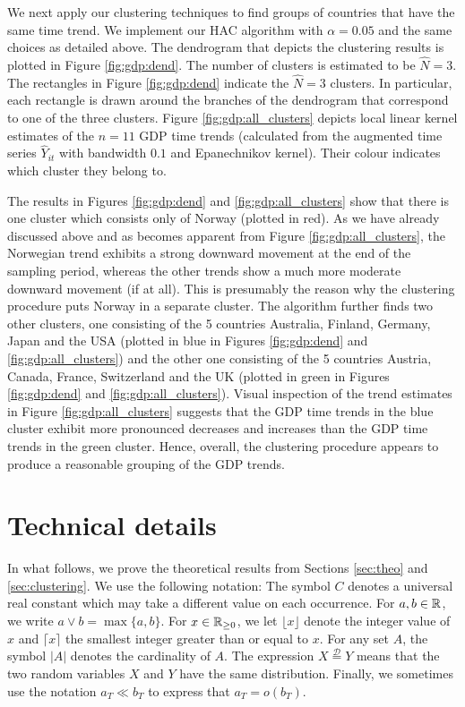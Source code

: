\documentclass[12pt]{article}
\begin{document}
We next apply our clustering techniques to find groups of countries that have the same time trend. We implement our HAC algorithm with $\alpha = 0.05$ and the same choices as detailed above. The dendrogram that depicts the clustering results is plotted in Figure \ref{fig:gdp:dend}. The number of clusters is estimated to be $\widehat{N} = 3$. The rectangles in Figure \ref{fig:gdp:dend} indicate the $\widehat{N} = 3$ clusters. In particular, each rectangle is drawn around the branches of the dendrogram that correspond to one of the three clusters. Figure \ref{fig:gdp:all_clusters} depicts local linear kernel estimates of the $n=11$ GDP time trends (calculated from the augmented time series $\widehat{Y}_{it}$ with bandwidth $0.1$ and Epanechnikov kernel). Their colour indicates which cluster they belong to. 


The results in Figures \ref{fig:gdp:dend} and \ref{fig:gdp:all_clusters} show that there is one cluster which consists only of Norway (plotted in red). As we have already discussed above and as becomes apparent from Figure \ref{fig:gdp:all_clusters}, the Norwegian trend exhibits a strong downward movement at the end of the sampling period, whereas the other trends show a much more moderate downward movement (if at all). This is presumably the reason why the clustering procedure puts Norway in a separate cluster. The algorithm further finds two other clusters, one consisting of the 5 countries Australia, Finland, Germany, Japan and the USA (plotted in blue in Figures \ref{fig:gdp:dend} and \ref{fig:gdp:all_clusters}) and the other one consisting of the 5 countries Austria, Canada, France, Switzerland and the UK (plotted in  green in Figures \ref{fig:gdp:dend} and \ref{fig:gdp:all_clusters}). Visual inspection of the trend estimates in Figure \ref{fig:gdp:all_clusters} suggests that the GDP time trends in the blue cluster exhibit more pronounced decreases and increases than the GDP time trends in the green cluster. Hence, overall, the clustering procedure appears to produce a reasonable grouping of the GDP trends.
 


\section{Technical details}\label{appendix}


In what follows, we prove the theoretical results from Sections \ref{sec:theo} and \ref{sec:clustering}. We use the following notation: The symbol $C$ denotes a universal real constant which may take a different value on each occurrence. For $a,b \in \mathbb{R}$, we write $a \vee b = \max\{a,b\}$. For $x \in \mathbb{R}_{\geq 0}$, we let $\lfloor x \rfloor$ denote the integer value of $x$ and $\lceil x \rceil$ the smallest integer greater than or equal to $x$. For any set $A$, the symbol $|A|$ denotes the cardinality of $A$. The expression $X \stackrel{\mathcal{D}}{=} Y$ means that the two random variables $X$ and $Y$ have the same distribution. Finally, we sometimes use the notation $a_T \ll b_T$ to express that $a_T = o(b_T)$. 
\end{document}
